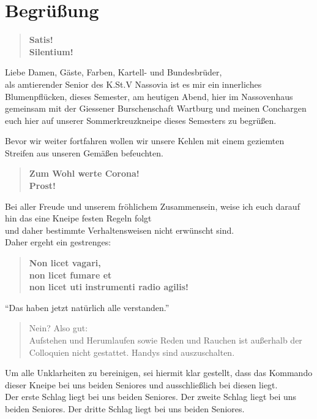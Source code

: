 \section{Begrüßung}

\begin{quote}
    \textbf{
        Satis!\\
        Silentium!
        }
\end{quote} 

Liebe Damen, Gäste, Farben, Kartell- und Bundesbrüder,\\
als amtierender Senior des K.St.V Nassovia ist es mir ein innerliches 
Blumenpflücken, dieses Semester, am heutigen Abend, hier im Nassovenhaus 
gemeinsam mit der Giessener Burschenschaft Wartburg und meinen Conchargen
euch hier auf unserer Sommerkreuzkneipe dieses Semesters zu begrüßen.

Bevor wir weiter fortfahren wollen wir unsere Kehlen mit einem geziemten
Streifen aus unseren Gemäßen befeuchten.


\begin{quote}
    \textbf{Zum Wohl werte Corona!}\\
    \textbf{Prost!}
\end{quote}

Bei aller Freude und unserem fröhlichem Zusammensein,
weise ich euch darauf hin das eine Kneipe festen Regeln folgt\\
und daher bestimmte Verhaltensweisen nicht erwünscht sind.\\
Daher ergeht ein gestrenges:
\begin{quote}
    \textbf{Non licet vagari,}\\
    \textbf{non licet fumare et}\\
    \textbf{non licet uti instrumenti radio agilis!}
\end{quote}
\enquote{Das haben jetzt natürlich alle verstanden.}
\begin{quote}
    Nein? Also gut:\\
    Aufstehen und Herumlaufen sowie Reden und Rauchen ist außerhalb 
    der Colloquien nicht gestattet. Handys sind auszuschalten.
\end{quote}

Um alle Unklarheiten zu bereinigen, sei hiermit klar gestellt,
dass das Kommando dieser Kneipe bei uns beiden Seniores und 
ausschließlich bei diesen liegt.\\
Der erste Schlag liegt bei uns beiden Seniores.
Der zweite Schlag liegt bei uns beiden Seniores.
Der dritte Schlag liegt bei uns beiden Seniores.

